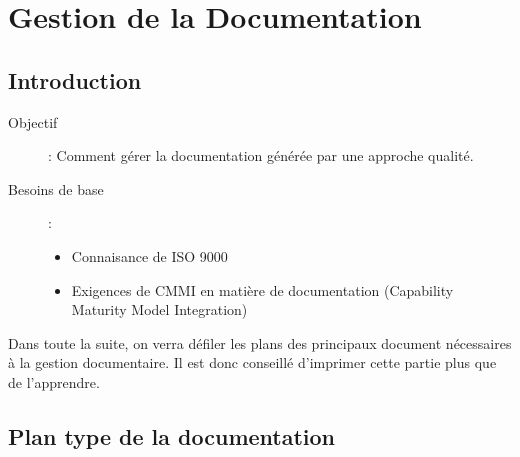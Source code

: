 \chapter{Gestion de la Documentation}

\section{Introduction}

\begin{description}
\item[Objectif] : Comment gérer la documentation générée par une approche qualité.
\item[Besoins de base] :
	\begin{itemize}
	\item Connaisance de ISO 9000
	\item Exigences de CMMI en matière de documentation (Capability Maturity Model Integration)
	\end{itemize}
\end{description}

Dans toute la suite, on verra défiler les plans des principaux document nécessaires à la gestion documentaire. Il est donc conseillé d’imprimer cette partie plus que de l’apprendre.

\section{Plan type de la documentation}

